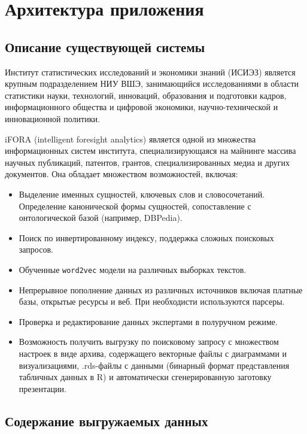 
\usepackage{setspace}


\chapter{Архитектура приложения}

\section{Описание существующей системы}

Институт статистических исследований и экономики знаний (ИСИЭЗ) является крупным подразделением НИУ ВШЭ, занимающийся исследованиями в области статистики науки, технологий, инноваций, образования и подготовки кадров, информационного общества и цифровой экономики, научно-технической и инновационной политики.

iFORA (intelligent foresight analytics) является одной из множества информационных систем института, специализирующаяся на майнинге массива научных публикаций, патентов, грантов, специализированных медиа и других документов. Она обладает множеством возможностей, включая:

\begin{itemize}
\item Выделение именных сущностей, ключевых слов и словосочетаний. Определение канонической формы сущностей, сопоставление с онтологической базой (например, DBPedia).
\item Поиск по инвертированному индексу, поддержка сложных поисковых запросов.
\item Обученные \texttt{word2vec} модели на различных выборках текстов.
\item Непрерывное пополнение данных из различных источников включая платные базы, открытые ресурсы и веб. При необходисти используются парсеры.
\item Проверка и редактирование данных экспертами в полуручном режиме.
\item Возможность получить выгрузку по поисковому запросу с множеством настроек в виде архива, содержащего векторные файлы с диаграммами и визуализациями, .rds-файлы с данными (бинарный формат представления табличных данных в R) и автоматически сгенерированную заготовку презентации.
\end{itemize}

\section{Содержание выгружаемых данных}

